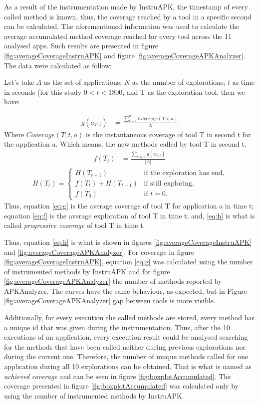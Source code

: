 As a result of the instrumentation made by InstruAPK, the timestamp of every called method is known, thus, the coverage reached by a tool in a specific second can be calculated. The aforementioned information was used to calculate the average accumulated method coverage reached for every tool across the 11 analysed apps. Such results are presented in figure \ref{fig:averageCoverageInstruAPK} and figure \ref{fig:averageCoverageAPKAnalyzer}. The data were calculated as follow:

Let's take $A$ as the set of applications; $N$ as the number of explorations; $t$ as time in seconds (for this study $0<t<1800$, and T as the exploration tool, then we have:

\begin{align}
  g(a_{T,t}) &= \frac{\sum_{i=1}^{n} Coverage(T,t,a)}{N}\label{eq:g} 
\end{align}
Where $Coverage(T,t,a)$ is the instantaneous coverage of tool T in second t for the application a. Which means, the new methods called by tool T in second t.
\begin{align}
f(T_t) &= \frac{\sum_{a \in A} g(a_{T,t})}{|A|} \label{eq:f}
\end{align}
\begin{align}
H(T_t)=\begin{cases}
		H(T_{t-1})& \text{if the exploration has end},\\ 
		f(T_t)+H(T_{t-1})& \text{if still exploring},\\
		f(T_0)& \text{if $t = 0$}.\label{eq:h}
	\end{cases}
\end{align}
Thus, equation \ref{eq:g} is the average coverage of tool T for application a in time t; equation \ref{eq:f} is the average exploration of tool T in time t; and, \ref{eq:h} is what is called \textit{progressive coverage} of tool T in time t. 

Thus, equation \ref{eq:h} is what is shown in figures \ref{fig:averageCoverageInstruAPK} and \ref{fig:averageCoverageAPKAnalyzer}. For coverage in figure \ref{fig:averageCoverageInstruAPK}, equation \ref{eq:g} was calculated using the number of instrumented methods by InstruAPK and for figure \ref{fig:averageCoverageAPKAnalyzer} the number of methods reported by APKAnalyzer. The curves have the same behaviour, as expected, but in Figure \ref{fig:averageCoverageAPKAnalyzer} gap between tools is more visible.

Additionally, for every execution the called methods are stored, every method has a unique id that was given during the instrumentation. Thus, after the 10 executions of an application, every execution result could be analysed searching for the methods that have been called neither during previous explorations nor during the current one. Therefore, the number of unique methods called for one application during all 10 explorations can be obtained. That is what is named as \textit{achieved coverage} and can be seen in figure \ref{fig:boxplotAccumulated}. The coverage presented in figure \ref{fig:boxplotAccumulated} was calculated only by using the number of instrumented methods by InstruAPK. 

